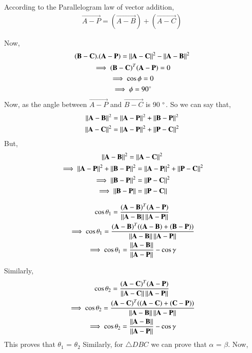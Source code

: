 \documentclass[journal,12pt,twocolumn]{IEEEtran}
\begin{document}
According to the Parallelogram law of vector addition,
\begin{align}
\vec{A-P} = (\vec{A-B}) + (\vec{A-C})
\end{align}

Now, 
\begin{multline}
(\mathbf{B-C}). (\mathbf{A-P}) = \left\lVert\mathbf{A-C}\right\rVert^2 - \left\lVert\mathbf{A-B}\right\rVert^2\\
\implies (\mathbf{B-C})^T (\mathbf{A-P}) = 0\\
\implies \cos\phi = 0\\
\implies \phi = 90 \degree
\end{multline}
Now, as the angle between $\vec{A-P}$ and $\vec{B-C}$ is 90 $\degree$. So we can say that,
\begin{multline}
\left\lVert\mathbf{A-B}\right\rVert^2 = \left\lVert\mathbf{A-P}\right\rVert^2 + \left\lVert\mathbf{B-P}\right\rVert^2\\
\left\lVert\mathbf{A-C}\right\rVert^2 = \left\lVert\mathbf{A-P}\right\rVert^2 + \left\lVert\mathbf{P-C}\right\rVert^2\\
\end{multline}
But,
\begin{multline}
\left\lVert\mathbf{A-B}\right\rVert^2 = \left\lVert\mathbf{A-C}\right\rVert^2\\
\implies \left\lVert\mathbf{A-P}\right\rVert^2 + \left\lVert\mathbf{B-P}\right\rVert^2 = \left\lVert\mathbf{A-P}\right\rVert^2 + \left\lVert\mathbf{P-C}\right\rVert^2\\
\implies \left\lVert\mathbf{B-P}\right\rVert^2 = \left\lVert\mathbf{P-C}\right\rVert^2\\
\implies \left\lVert\mathbf{B-P}\right\rVert = \left\lVert\mathbf{P-C}\right\rVert
\end{multline}

\begin{multline}
\cos\theta_1 = \frac{(\mathbf{A-B})^T (\mathbf{A-P})}{\left\lVert\mathbf{A-B}\right\rVert\left\lVert\mathbf{A-P}\right\rVert}\\
\implies \cos\theta_1 = \frac{(\mathbf{A-B})^T ((\mathbf{A-B})+(\mathbf{B-P}))}{\left\lVert\mathbf{A-B}\right\rVert\left\lVert\mathbf{A-P}\right\rVert}\\
\implies \cos\theta_1 = \frac{\left\lVert\mathbf{A-B}\right\rVert}{\left\lVert\mathbf{A-P}\right\rVert} - \cos\gamma\\
\end{multline}

Similarly,
\begin{multline}
\cos\theta_2 = \frac{(\mathbf{A-C})^T (\mathbf{A-P})}{\left\lVert\mathbf{A-C}\right\rVert\left\lVert\mathbf{A-P}\right\rVert}\\
\implies \cos\theta_2 = \frac{(\mathbf{A-C})^T ((\mathbf{A-C})+(\mathbf{C-P}))}{\left\lVert\mathbf{A-B}\right\rVert\left\lVert\mathbf{A-P}\right\rVert}\\
\implies \cos\theta_2 = \frac{\left\lVert\mathbf{A-B}\right\rVert}{\left\lVert\mathbf{A-P}\right\rVert} - \cos\gamma\\
\end{multline}
This proves that $\theta_1$ = $\theta_2$
Similarly, for $\triangle DBC$ we can prove that $\alpha$ = $\beta$.
Now, 
\end{document}

